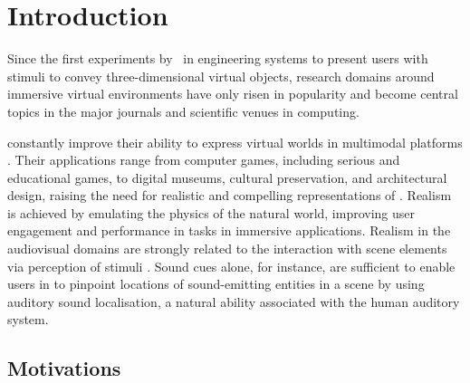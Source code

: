 \chapter{Introduction}\label{ch:introduction}
Since the first experiments by~\cite{sutherland1968head} in engineering systems to present users with stimuli to convey three-dimensional virtual objects, research domains around immersive virtual environments have only risen in popularity and become central topics in the major journals and scientific venues in computing.\par
{} constantly improve their ability to express virtual worlds in multimodal platforms \citep{rubio2017immersive}. Their applications range from computer games, including serious and educational games, to digital museums, cultural preservation, and architectural design, raising the need for realistic and compelling representations of . Realism is achieved by emulating the physics of the natural world, improving user engagement and performance in tasks in immersive applications. Realism in the audiovisual domains are strongly related to the interaction with scene elements via perception of stimuli \citep{zimmons2003influence, lokki2005navigation}. Sound cues alone, for instance, are sufficient to enable users in  to pinpoint locations of sound-emitting entities in a scene by using auditory sound localisation, a natural ability associated with the human auditory system.\par

\section{Motivations}

